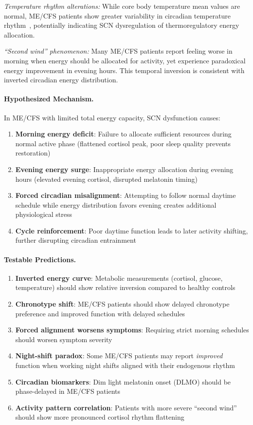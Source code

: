 \begin{hypothesis}
\textit{Temperature rhythm alterations:}
While core body temperature mean values are normal, ME/CFS patients show greater variability in circadian temperature rhythm~\cite{williams2001circadian}, potentially indicating SCN dysregulation of thermoregulatory energy allocation.

\textit{``Second wind'' phenomenon:}
Many ME/CFS patients report feeling worse in morning when energy should be allocated for activity, yet experience paradoxical energy improvement in evening hours. This temporal inversion is consistent with inverted circadian energy distribution.

\paragraph{Hypothesized Mechanism.}
In ME/CFS with limited total energy capacity, SCN dysfunction causes:
\begin{enumerate}
  \item \textbf{Morning energy deficit}: Failure to allocate sufficient resources during normal active phase (flattened cortisol peak, poor sleep quality prevents restoration)
  \item \textbf{Evening energy surge}: Inappropriate energy allocation during evening hours (elevated evening cortisol, disrupted melatonin timing)
  \item \textbf{Forced circadian misalignment}: Attempting to follow normal daytime schedule while energy distribution favors evening creates additional physiological stress
  \item \textbf{Cycle reinforcement}: Poor daytime function leads to later activity shifting, further disrupting circadian entrainment
\end{enumerate}

\paragraph{Testable Predictions.}
\begin{enumerate}
  \item \textbf{Inverted energy curve}: Metabolic measurements (cortisol, glucose, temperature) should show relative inversion compared to healthy controls
  \item \textbf{Chronotype shift}: ME/CFS patients should show delayed chronotype preference and improved function with delayed schedules
  \item \textbf{Forced alignment worsens symptoms}: Requiring strict morning schedules should worsen symptom severity
  \item \textbf{Night-shift paradox}: Some ME/CFS patients may report \textit{improved} function when working night shifts aligned with their endogenous rhythm
  \item \textbf{Circadian biomarkers}: Dim light melatonin onset (DLMO) should be phase-delayed in ME/CFS patients
  \item \textbf{Activity pattern correlation}: Patients with more severe ``second wind'' should show more pronounced cortisol rhythm flattening
\end{enumerate}


\end{hypothesis}
